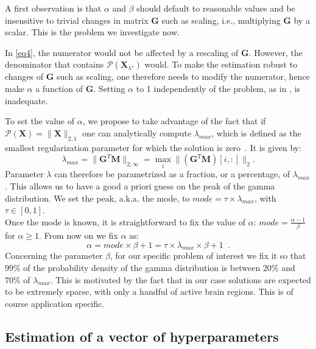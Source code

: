 A first observation is that $\alpha$ and $\beta$ should default to reasonable values and be insensitive to trivial changes in matrix $\mathbf{G}$ such as scaling, i.e., multiplying $\mathbf{G}$ by a scalar.
This is the problem we investigate now.

In \eqref{eq4}, the numerator would not be affected by a rescaling of $\mathbf{G}$. However, the denominator that contains $\mathcal{P}(\mathbf{X}_{\lambda^\star})$ would. To make the estimation robust to changes of $\mathbf{G}$ such as scaling, one therefore needs to modify the numerator, hence make $\alpha$ a function of $\mathbf{G}$. Setting $\alpha$ to 1 independently of the problem, as in \cite{Figueiredo}, is inadequate.

To set the value of $\alpha$, we propose to take advantage of the fact that if $\mathcal{P}(\mathbf{X})=\|\mathbf{X}\|_{2,1}$ one can analytically compute  $\lambda_{max}$, which is defined as the smallest regularization parameter for which the solution is zero~\cite{bach2012optimization}.
 It is given by:
\begin{equation}
\lambda_{max} = \|\mathbf{G}^T\mathbf{M}\|_{2,\infty}=\max_i \|(\mathbf{G}^T\mathbf{M})[i, :]\|_2.
\end{equation}
Parameter $\lambda$ can therefore be parametrized as a fraction, or a percentage, of $\lambda_{max}$.
This allows us to have a good a priori guess on the peak of the gamma distribution. We set the peak, a.k.a. the mode, to $mode=\tau\times\lambda_{max}$, with $\tau\in[0,1]$.
\\
Once the mode is known, it is straightforward to fix the value of $\alpha$: $mode =\frac{\alpha - 1}{\beta}$ for $\alpha \ge 1$. From now on we fix $\alpha$ as:
\begin{equation}
\alpha = mode \times \beta + 1 = \tau\times \lambda_{max} \times \beta + 1 \enspace .
\end{equation}
Concerning the parameter $\beta$, for our specific problem of interest we fix it so that $99\%$ of the probability density of the gamma distribution is between $20\%$ and $70\%$ of $\lambda_{max}$. This is motivated by the fact that in our case solutions are expected to be extremely sparse, with only a handful of active brain regions. This is of course application specific.
 
\subsection{Estimation of a vector of hyperparameters}

